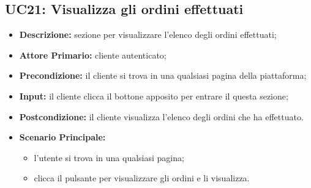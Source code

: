 \subsection{UC21: Visualizza gli ordini effettuati}
\label{sec:UC21}
\begin{itemize}
    \item \textbf{Descrizione:} sezione per visualizzare l'elenco degli ordini effettuati;
    \item \textbf{Attore Primario:} cliente autenticato;
    \item \textbf{Precondizione:} il cliente si trova in una qualsiasi pagina della piattaforma;
    \item \textbf{Input:} il cliente clicca il bottone apposito per entrare il questa sezione;
    \item \textbf{Postcondizione:} il cliente visualizza l'elenco degli ordini che ha effettuato.
    \item \textbf{Scenario Principale:}
    \begin{itemize}
        \item l'utente si trova in una qualsiasi pagina;
        \item clicca il pulsante per visualizzare gli ordini e li visualizza.
    \end{itemize}
\end{itemize}